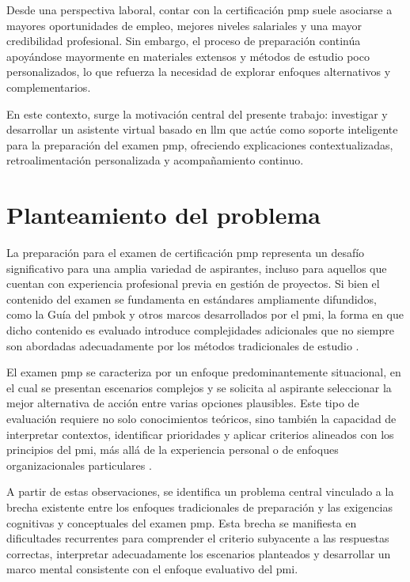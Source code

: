 Desde una perspectiva laboral, contar con la certificación \gls{pmp} suele asociarse a mayores oportunidades de empleo, mejores niveles salariales y una mayor credibilidad profesional. Sin embargo, el proceso de preparación continúa apoyándose mayormente en materiales extensos y métodos de estudio poco personalizados, lo que refuerza la necesidad de explorar enfoques alternativos y complementarios.

En este contexto, surge la motivación central del presente trabajo: investigar y desarrollar un asistente virtual basado en \gls{llm} que actúe como soporte inteligente para la preparación del examen \gls{pmp}, ofreciendo explicaciones contextualizadas, retroalimentación personalizada y acompañamiento continuo.

\section{Planteamiento del problema}

La preparación para el examen de certificación \gls{pmp} representa un desafío significativo para una amplia variedad de aspirantes, incluso para aquellos que cuentan con experiencia profesional previa en gestión de proyectos. Si bien el contenido del examen se fundamenta en estándares ampliamente difundidos, como la Guía del \gls{pmbok} y otros marcos desarrollados por el \gls{pmi}, la forma en que dicho contenido es evaluado introduce complejidades adicionales que no siempre son abordadas adecuadamente por los métodos tradicionales de estudio \parencite{pmbok7, pmi2021handbook}.

El examen \gls{pmp} se caracteriza por un enfoque predominantemente situacional, en el cual se presentan escenarios complejos y se solicita al aspirante seleccionar la mejor alternativa de acción entre varias opciones plausibles. Este tipo de evaluación requiere no solo conocimientos teóricos, sino también la capacidad de interpretar contextos, identificar prioridades y aplicar criterios alineados con los principios del \gls{pmi}, más allá de la experiencia personal o de enfoques organizacionales particulares \parencite{pmi2021handbook}.

A partir de estas observaciones, se identifica un problema central vinculado a la brecha existente entre los enfoques tradicionales de preparación y las exigencias cognitivas y conceptuales del examen \gls{pmp}. Esta brecha se manifiesta en dificultades recurrentes para comprender el criterio subyacente a las respuestas correctas, interpretar adecuadamente los escenarios planteados y desarrollar un marco mental consistente con el enfoque evaluativo del \gls{pmi}.

